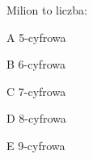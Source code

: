 \begin{tresc}
Milion to liczba:
\end{tresc}
\begin{wariant}{A} 5-cyfrowa \end{wariant}
\begin{wariant}{B} 6-cyfrowa \end{wariant}
\begin{wariant}{C} 7-cyfrowa \end{wariant}
\begin{wariant}{D} 8-cyfrowa \end{wariant}
\begin{wariant}{E} 9-cyfrowa \end{wariant}
